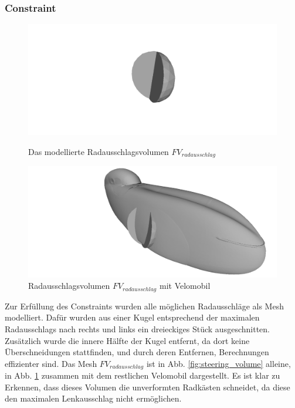 \subsubsection{Constraint}
\begin{figure}[h]
	\centering
	\begin{minipage}{0.45\textwidth}
		\centering
		\includegraphics[width=1\linewidth]{bilder/radausschlag.png}
		\caption{Das modellierte Radausschlagsvolumen $FV_{radausschlag}$}
		\label{fig:steering_volume}
	\end{minipage}\hfill
	\begin{minipage}{0.45\textwidth}
		\centering
		\includegraphics[width=1\linewidth]{bilder/radausschlag_inclVelo.png}
		\caption{Radausschlagsvolumen $FV_{radausschlag}$ mit Velomobil}
		\label{fig:steering_volume_with_velo}
	\end{minipage}
\end{figure}
Zur Erfüllung des Constraints wurden alle möglichen Radausschläge als Mesh modelliert.
Dafür wurden aus einer Kugel entsprechend der maximalen Radausschlags nach rechts und links ein dreieckiges Stück ausgeschnitten.
Zusätzlich wurde die innere Hälfte der Kugel entfernt, da dort keine Überschneidungen stattfinden, und durch deren Entfernen, Berechnungen effizienter sind.
Das Mesh $FV_{radausschlag}$ ist in Abb. \cref{fig:steering_volume} alleine, in Abb. \cref{fig:steering_volume_with_velo} zusammen mit dem restlichen Velomobil dargestellt.
Es ist klar zu Erkennen, dass dieses Volumen die unverformten Radkästen schneidet, da diese den maximalen Lenkausschlag nicht ermöglichen.
 

